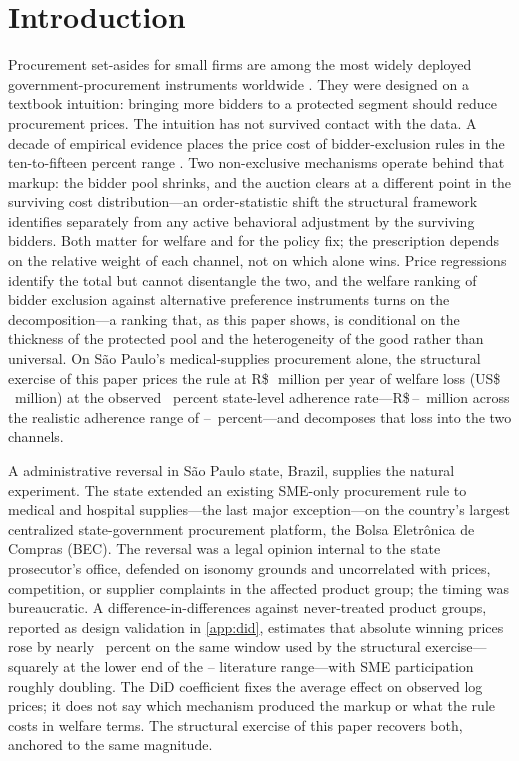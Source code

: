 \section{Introduction}

Procurement set-asides for small firms are among the most widely deployed government-procurement instruments worldwide \citep{bosio2022}. They were designed on a textbook intuition: bringing more bidders to a protected segment should reduce procurement prices. The intuition has not survived contact with the data. A decade of empirical evidence places the price cost of bidder-exclusion rules in the ten-to-fifteen percent range \citep{marion2007, krasnokutskaya2011, athey2013, nakabayashi2013, hyytinen2018}. Two non-exclusive mechanisms operate behind that markup: the bidder pool shrinks, and the auction clears at a different point in the surviving cost distribution---an order-statistic shift the structural framework identifies separately from any active behavioral adjustment by the surviving bidders. Both matter for welfare and for the policy fix; the prescription depends on the relative weight of each channel, not on which alone wins. Price regressions identify the total but cannot disentangle the two, and the welfare ranking of bidder exclusion against alternative preference instruments turns on the decomposition---a ranking that, as this paper shows, is conditional on the thickness of the protected pool and the heterogeneity of the good rather than universal. On São Paulo's medical-supplies procurement alone, the structural exercise of this paper prices the rule at R\$\,\welfAnnualBRLLo~million per year of welfare loss (US\$\,\welfAnnualUSDLo~million) at the observed \adherenceGsixtyfivePost~percent state-level adherence rate---R\$\,\welfRangeLoBRL--\welfRangeHiBRL~million across the realistic adherence range of \welfAdherenceLoPct--\welfAdherenceHiPct~percent---and decomposes that loss into the two channels.

A \policyCutoffMonth{} administrative reversal in S\~ao Paulo state, Brazil, supplies the natural experiment. The state extended an existing SME-only procurement rule to medical and hospital supplies---the last major exception---on the country's largest centralized state-government procurement platform, the Bolsa Eletr\^onica de Compras (BEC). The reversal was a legal opinion internal to the state prosecutor's office, defended on isonomy grounds and uncorrelated with prices, competition, or supplier complaints in the affected product group; the timing was bureaucratic. A difference-in-differences against \controlGroupCount{} never-treated product groups, reported as design validation in \ref{app:did}, estimates that absolute winning prices rose by nearly \didLowerPct{}~percent on the same window used by the structural exercise---squarely at the lower end of the \citet{marion2007}--\citet{hyytinen2018} literature range---with SME participation roughly doubling. The DiD coefficient fixes the average effect on observed log prices; it does not say which mechanism produced the markup or what the rule costs in welfare terms. The structural exercise of this paper recovers both, anchored to the same magnitude.

